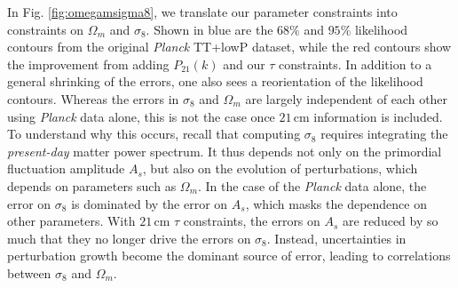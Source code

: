 \documentclass[twocolumn,aps,prd,nofootinbib,showpacs,superscriptaddress]{revtex4-1}
\begin{document}
In Fig. \ref{fig:omegamsigma8}, we translate our parameter constraints into constraints on $\Omega_m$ and $\sigma_8$. Shown in blue are the $68\%$ and $95\%$ likelihood contours from the original \emph{Planck} TT+lowP dataset, while the red contours show the improvement from adding $P_{21} (k)$ and our $\tau$ constraints. In addition to a general shrinking of the errors, one also sees a reorientation of the likelihood contours. Whereas the errors in $\sigma_8$ and $\Omega_m$ are largely independent of each other using \emph{Planck} data alone, this is not the case once $21\,\textrm{cm}$ information is included. To understand why this occurs, recall that computing $\sigma_8$ requires integrating the \emph{present-day} matter power spectrum. It thus depends not only on the primordial fluctuation amplitude $A_s$, but also on the evolution of perturbations, which depends on parameters such as $\Omega_m$. In the case of the \emph{Planck} data alone, the error on $\sigma_8$ is dominated by the error on $A_s$, which masks the dependence on other parameters. With $21\,\textrm{cm}$ $\tau$ constraints, the errors on $A_s$ are reduced by so much that they no longer drive the errors on $\sigma_8$. Instead, uncertainties in perturbation growth become the dominant source of error, leading to correlations between $\sigma_8$ and $\Omega_m$.
%
\end{document}

